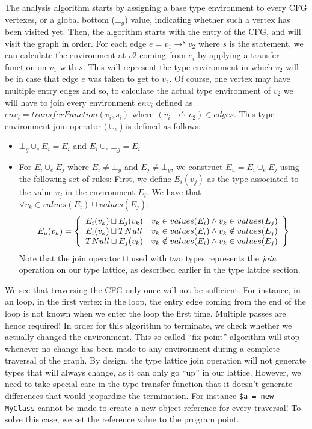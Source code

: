 \documentclass[a4paper]{article}
\begin{document}
The analysis algorithm starts by assigning a base type environment to every CFG
vertexes, or a global bottom ($\bot_g$) value, indicating whether such a vertex
has been visited yet. Then, the algorithm starts with the entry of the CFG, and
will visit the graph in order. For each edge $e = v_1 \rightarrow^s v_2$ where
$s$ is the statement, we can calculate the environment at $v2$ coming from
$e_i$ by applying a transfer function on $v_1$ with $s$. This will represent
the type environment in which $v_2$ will be in case that edge $e$ was taken to
get to $v_2$. Of course, one vertex may have multiple entry edges and so, to
calculate the actual type environment of $v_2$ we will have to join every
environment $env_i$ defined as $env_i = transferFunction(v_i, s_i)$ where $(v_i
\rightarrow^{s_i} v_2) \in edges$. This type environment join operator
($\cup_e$) is defined as follows:
\begin{itemize}
  \item $\bot_g \cup_e E_i = E_i$ and $E_i \cup_e \bot_g = E_i$
  \item For $E_i \cup_e E_j$ where $E_i \neq \bot_g$ and $E_j \neq \bot_g$, we
    construct $E_u = E_i \cup_e E_j$ using the following set of rules: First,
    we define $E_i(v_j)$ as the type associated to the value $v_j$ in the
    environment $E_i$.  We have that $ \forall v_k \in values(E_i) \cup
    values(E_j):$
    \begin{eqnarray*}
      E_u(v_k) = \left \{ \begin{array}{l l}
        E_i(v_k) \sqcup E_j(v_k) & v_k \in values(E_i)    \wedge v_k \in values(E_j) \\
        E_i(v_k) \sqcup TNull    & v_k \in values(E_i)    \wedge v_k \notin values(E_j) \\
        TNull    \sqcup E_j(v_k) & v_k \notin values(E_i) \wedge v_k \in values(E_j)
      \end{array} \right \}
    \end{eqnarray*}
    Note that the join operator $\sqcup$ used with two types represents the
    \emph{join} operation on our type lattice, as described earlier in the 
    type lattice section.
\end{itemize}

We see that traversing the CFG only once will not be sufficient. For instance, in
an loop, in the first vertex in the loop, the entry edge coming from the end
of the loop is not known when we enter the loop the first time. Multiple passes
are hence required! In order for this algorithm to terminate, we check whether
we actually changed the environment. This so called ``fix-point'' algorithm will
stop whenever no change has been made to any environment during a complete
traversal of the graph. By design, the type lattice join operation will not
generate types that will always change, as it can only go ``up'' in our
lattice. However, we need to take special care in the type transfer function that
it doesn't generate differences that would jeopardize the termination. For instance
\verb/$a = new MyClass/ cannot be made to create a new object reference for
every traversal! To solve this case, we set the reference value to the program point.
\end{document}
